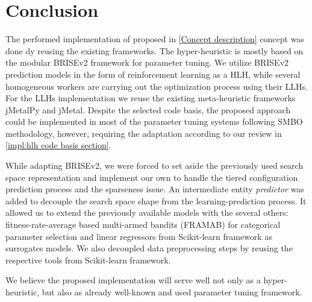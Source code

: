 \section{Conclusion}
The performed implementation of proposed in \cref{Concept description} concept was done dy reusing the existing frameworks. The hyper-heuristic is mostly based on the modular BRISEv2 framework for parameter tuning. We utilize BRISEv2 prediction models in the form of reinforcement learning as a HLH, while several homogeneous workers are carrying out the optimization process using their LLHs. For the LLHs implementation we reuse the existing meta-heuristic frameworks jMetalPy and jMetal. Despite the selected code basis, the proposed approach could be implemented in most of the parameter tuning systems following SMBO methodology, however, requiring the adaptation according to our review in \cref{impl:hlh code basis section}.

While adapting BRISEv2, we were forced to set aside the previously used search space representation and implement our own to handle the tiered configuration prediction process and the sparseness issue. An intermediate entity \emph{predictor} was added to decouple the search space shape from the learning-prediction process. It allowed us to extend the previously available models with the several others: fitness-rate-average based multi-armed bandits (FRAMAB) for categorical parameter selection and linear regressors from Scikit-learn framework as surrogates models. We also decoupled data preprocessing steps by reusing the respective tools from Scikit-learn framework.

We believe the proposed implementation will serve well not only as a hyper-heuristic, but also as already well-known and used parameter tuning framework.